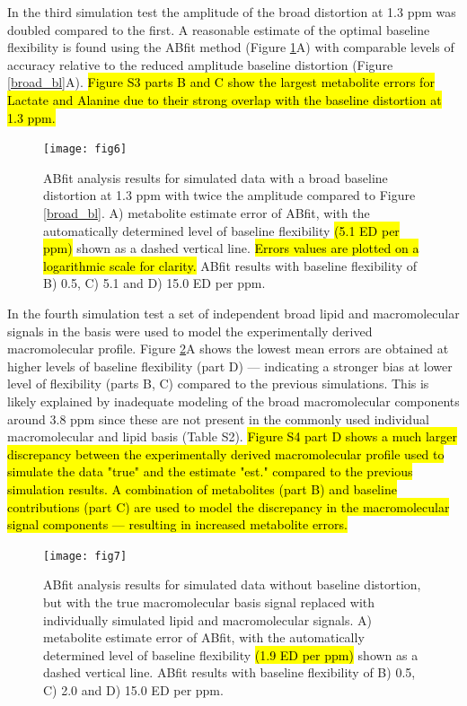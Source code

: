 \documentclass[num-refs]{wiley-article}
\newcommand{\revone}[2]{\hl{#1}\marginnote{\hl{#2}}}
\newcommand{\revonenm}[1]{\hl{#1}} %
\begin{document}
In the third simulation test the amplitude of the broad distortion at 1.3 ppm was doubled compared to the first. A reasonable estimate of the optimal baseline flexibility is found using the ABfit method (Figure \ref{big_broad_bl}A) with comparable levels of accuracy relative to the reduced amplitude baseline distortion (Figure \ref{broad_bl}A). \revone{Figure S3 parts B and C show the largest metabolite errors for Lactate and Alanine due to their strong overlap with the baseline distortion at 1.3 ppm.}{R1.2}

\begin{figure}
  \begin{center}
    \texttt{[image: fig6]}
    \caption{ABfit analysis results for simulated data with a broad baseline distortion at 1.3 ppm with twice the amplitude compared to Figure \ref{broad_bl}. A) metabolite estimate error of ABfit, with the automatically determined level of baseline flexibility \revonenm{(5.1 ED per ppm)} shown as a dashed vertical line. \revonenm{Errors values are plotted on a logarithmic scale for clarity.} ABfit results with baseline flexibility of B) 0.5, C) 5.1 and D) 15.0 ED per ppm.}
    \label{big_broad_bl}
  \end{center}
\end{figure}

In the fourth simulation test a set of independent broad lipid and macromolecular signals in the basis were used to model the experimentally derived macromolecular profile. Figure \ref{sim_lip_mm_basis}A shows the lowest mean errors are obtained at higher levels of baseline flexibility (part D) --- indicating a stronger bias at lower level of flexibility (parts B, C) compared to the previous simulations. This is likely explained by inadequate modeling of the broad macromolecular components around 3.8 ppm since these are not present in the commonly used individual macromolecular and lipid basis (Table S2). \revone{Figure S4 part D shows a much larger discrepancy between the experimentally derived macromolecular profile used to simulate the data "true" and the estimate "est." compared to the previous simulation results. A combination of metabolites (part B) and baseline contributions (part C) are used to model the discrepancy in the macromolecular signal components --- resulting in increased metabolite errors.}{R1.2}

\begin{figure}
  \begin{center}
    \texttt{[image: fig7]}
    \caption{ABfit analysis results for simulated data without baseline distortion, but with the true macromolecular basis signal replaced with individually simulated lipid and macromolecular signals. A) metabolite estimate error of ABfit, with the automatically determined level of baseline flexibility \revonenm{(1.9 ED per ppm)} shown as a dashed vertical line. ABfit results with baseline flexibility of B) 0.5, C) 2.0 and D) 15.0 ED per ppm.}
    \label{sim_lip_mm_basis}
  \end{center}
\end{figure}
\end{document}
